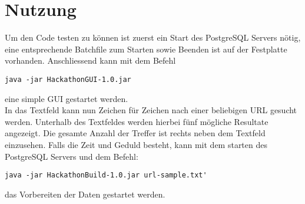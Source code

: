 \documentclass[10pt]{article} %
\begin{document}
\section{Nutzung}
Um den Code testen zu können ist zuerst ein Start des PostgreSQL Servers nötig, eine entsprechende Batchfile zum Starten sowie Beenden ist auf der Festplatte vorhanden. Anschliessend kann mit dem Befehl \begin{lstlisting}
java -jar HackathonGUI-1.0.jar
\end{lstlisting} eine simple GUI gestartet werden.\\
In das Textfeld kann nun Zeichen für Zeichen nach einer beliebigen URL gesucht werden. Unterhalb des Textfeldes werden hierbei fünf mögliche Resultate angezeigt. Die gesamte Anzahl der Treffer ist rechts neben dem Textfeld einzusehen.
Falls die Zeit und Geduld besteht, kann mit dem starten des PostgreSQL Servers und dem Befehl:
\begin{lstlisting}
java -jar HackathonBuild-1.0.jar url-sample.txt'
\end{lstlisting}
das Vorbereiten der Daten gestartet werden.
\end{document}
